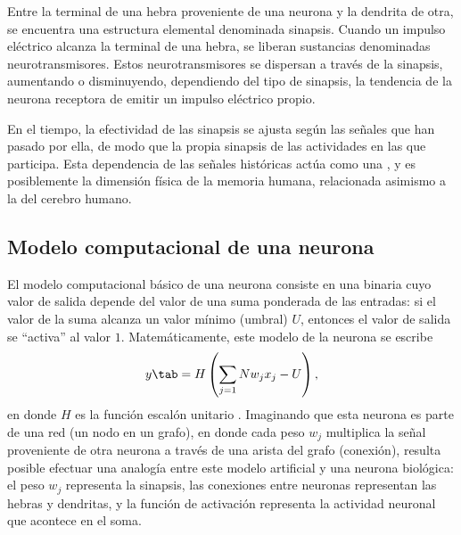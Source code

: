 Entre la terminal de una hebra proveniente de una neurona y la
dendrita de otra, se encuentra una estructura elemental denominada
sinapsis.  Cuando un impulso eléctrico alcanza la terminal de una
hebra, se liberan sustancias denominadas neurotransmisores. Estos
neurotransmisores se dispersan a través de la sinapsis, aumentando o
disminuyendo, dependiendo del tipo de sinapsis, la tendencia de la
neurona receptora de emitir un impulso eléctrico propio.

En el tiempo, la efectividad de las sinapsis se ajusta según las
señales que han pasado por ella, de modo que la propia sinapsis
 de las actividades en las que participa. Esta dependencia
de las señales históricas actúa como una , y es
posiblemente la dimensión física de la memoria humana, relacionada
asimismo a la  del cerebro humano.
%
%
\subsection{Modelo computacional de una neurona}
%
El modelo computacional básico de una neurona consiste en una
 binaria cuyo valor de salida depende del
valor de una suma ponderada de las entradas: si el valor de la suma
alcanza un valor mínimo (umbral) $U$, entonces el valor de salida se
``activa'' al valor $1$.  Matemáticamente, este modelo de la neurona
se escribe
%
\begin{align}\label{e2:neuron-basic}
  y \tab = H\left( \sum_{j=1}{N} w_j x_j - U\right),
\end{align}
%
en donde $H$ es la función escalón unitario \cite{mcculloch-pitts}.
Imaginando que esta neurona es parte de una red (un nodo en un grafo),
en donde cada peso $w_j$ multiplica la señal proveniente de otra
neurona a través de una arista del grafo (conexión), resulta posible
efectuar una analogía entre este modelo artificial y una neurona
biológica: el peso $w_j$ representa la sinapsis, las conexiones entre
neuronas representan las hebras y dendritas, y la función de
activación representa la actividad neuronal que acontece en el soma.

